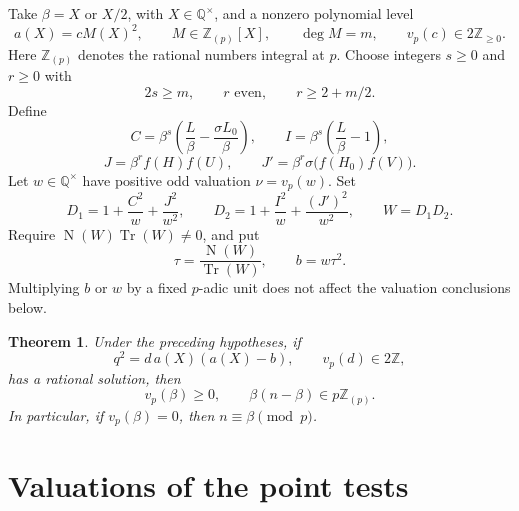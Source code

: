 \documentclass[11pt,a4paper]{article}
\newtheorem{theorem}{Theorem}[section]
\newcommand{\Q}{\mathbb Q}\newcommand{\Z}{\mathbb Z}
\DeclareMathOperator{\Tr}{Tr}
\DeclareMathOperator{\N}{N}
\begin{document}
Take $\beta=X$ or $X/2$, with $X\in\Q^\times$, and a nonzero polynomial
level
\begin{equation}\label{eq:level}
 a(X)=cM(X)^2,\qquad M\in\Z_{(p)}[X],\qquad \deg M=m,\qquad
 v_p(c)\in2\Z_{\ge0}.
\end{equation}
Here $\Z_{(p)}$ denotes the rational numbers integral at $p$.
Choose integers $s\ge0$ and $r\ge0$ with
\begin{equation}\label{eq:exponents}
                  2s\ge m,\qquad r\text{ even},\qquad r\ge2+m/2.
\end{equation}
Define
\[
 C=\beta^s\left(\frac L\beta-\frac{\sigma L_0}{\beta}\right),
 \qquad I=\beta^s\left(\frac L\beta-1\right),
\]
\[
 J=\beta^r f(H)f(U),\qquad
 J'=\beta^r\sigma\bigl(f(H_0)f(V)\bigr).
\]
Let $w\in\Q^\times$ have positive odd valuation
$\nu=v_p(w)$. Set
\begin{equation}\label{eq:detector}
 D_1=1+\frac{C^2}{w}+\frac{J^2}{w^2},\qquad
 D_2=1+\frac{I^2}{w}+\frac{(J')^2}{w^2},\qquad W=D_1D_2.
\end{equation}
Require $\N(W)\Tr(W)\ne0$, and put
\[
                  \tau=\frac{\N(W)}{\Tr(W)},\qquad b=w\tau^2.
\]
Multiplying $b$ or $w$ by a fixed $p$-adic unit does not affect the
valuation conclusions below.

\begin{theorem}\label{thm:local}
Under the preceding hypotheses, if
\begin{equation}\label{eq:complement}
               q^2=d\,a(X)(a(X)-b),\qquad v_p(d)\in2\Z,
\end{equation}
has a rational solution, then
\[
                         v_p(\beta)\ge0,\qquad
                         \beta(n-\beta)\in p\Z_{(p)}.
\]
In particular, if $v_p(\beta)=0$, then $n\equiv\beta\pmod p$.
\end{theorem}

\section{Valuations of the point tests}
\end{document}
